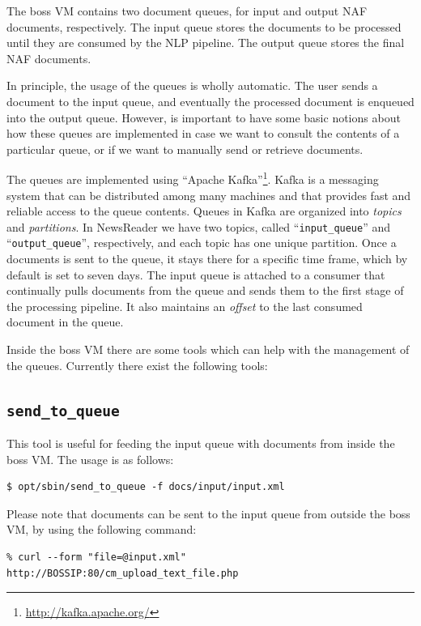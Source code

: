 \documentclass[a4]{article}
\begin{document}
The boss VM contains two document queues, for input and output NAF
documents, respectively. The input queue stores the documents to be
processed until they are consumed by the NLP pipeline. The output queue
stores the final NAF documents.

In principle, the usage of the queues is wholly automatic. The user sends a
document to the input queue, and eventually the processed document is
enqueued into the output queue. However, is important to have some basic
notions about how these queues are implemented in case we want to consult
the contents of a particular queue, or if we want to manually send or
retrieve documents.

The queues are implemented using ``Apache
Kafka''\footnote{\url{http://kafka.apache.org/}}. Kafka is a messaging
system that can be distributed among many machines and that provides fast
and reliable access to the queue contents. Queues in Kafka are organized
into \emph{topics} and \emph{partitions}. In NewsReader we have two topics,
called ``\texttt{input\_queue}'' and ``\texttt{output\_queue}'',
respectively, and each topic has one unique partition. Once a documents is
sent to the queue, it stays there for a specific time frame, which by
default is set to seven days. The input queue is attached to a consumer that
continually pulls documents from the queue and sends them to the first stage
of the processing pipeline. It also maintains an \emph{offset} to the last
consumed document in the queue.

Inside the boss VM there are some tools which can help with the management
of the queues. Currently there exist the following tools:

\subsection*{\texttt{send\_to\_queue}}
\label{sec:send-to-queue.pl}

This tool is useful for feeding the input queue with documents from inside
the \textrm{boss} VM. The usage is as follows:

\begin{verbatim}
$ opt/sbin/send_to_queue -f docs/input/input.xml
\end{verbatim}

Please note that documents can be sent to the input queue from outside the
\textrm{boss} VM, by using the following command:

\begin{verbatim}
% curl --form "file=@input.xml" http://BOSSIP:80/cm_upload_text_file.php
\end{verbatim}
\end{document}
